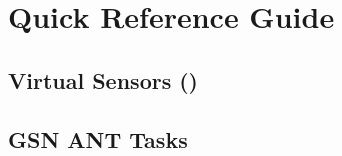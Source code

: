 \graphicspath{{chapters/ch-quickref/figures/}}

\chapter{Quick Reference Guide}

\section{Virtual Sensors (\vs)}

%
%



%
%
\newpage
\section{GSN ANT Tasks \label{quickref_ant_task}}

